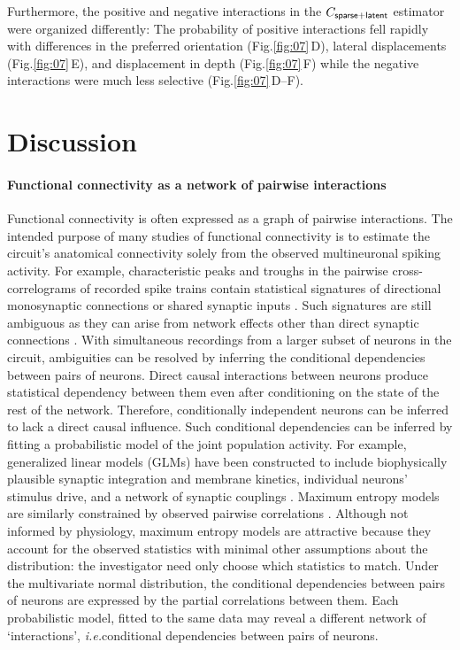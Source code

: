 \documentclass[10pt]{article}
\newcommand{\sq}[1]{\lq#1\rq}
\newcommand{\figref}[2]{Fig.\;\ref{fig:#1}\,#2}
\newcommand{\ie}{\emph{i.e.}\;}
\begin{document}
Furthermore, the positive and negative interactions in the $C_{\sf sparse+latent}$ estimator were organized differently: The probability of positive interactions fell rapidly with differences in the preferred orientation (\figref{07}{D}), lateral displacements (\figref{07}{E}), and displacement in depth (\figref{07}{F}) while the negative interactions were much less selective (\figref{07}{D--F}).

\section*{Discussion}
\paragraph{Functional connectivity as a network of pairwise interactions}
Functional connectivity is often expressed as a graph of pairwise interactions. The intended purpose of many studies of functional connectivity is to estimate the circuit's anatomical connectivity solely from the observed multineuronal spiking activity.  For example, characteristic peaks and troughs in the pairwise cross-correlograms of recorded spike trains contain statistical signatures of directional monosynaptic connections or shared synaptic inputs \cite{Gerstein:1964, Perkel:1967, Moore:1970, Alonso:1998, Denman:2013}.  Such signatures are still ambiguous as they can arise from network effects other than direct synaptic connections \cite{Aertsen:1989}.  With simultaneous recordings from a larger subset of neurons in the circuit, ambiguities can be resolved by inferring the conditional dependencies between pairs of neurons.  Direct causal interactions between neurons produce statistical dependency between them even after conditioning on the state of the rest of the network. Therefore, conditionally independent neurons can be inferred to lack a direct causal influence.  Such conditional dependencies can be inferred by fitting a probabilistic model of the joint population activity. For example, generalized linear models (GLMs) have been constructed to  include biophysically plausible synaptic integration and membrane kinetics, individual neurons' stimulus drive, and a network of synaptic couplings \cite{Pillow:2008}.  Maximum entropy models are similarly constrained by observed pairwise correlations \cite{Schneidman:2006, Tkacik:2006, Yu:2008, Tang:2008, Shlens:2009} .  Although not informed by physiology, maximum entropy models are attractive because they account for the observed statistics with minimal other assumptions about the distribution: the investigator need only choose which statistics to match.  Under the multivariate normal distribution, the conditional dependencies between pairs of neurons are expressed by the partial correlations between them.   Each probabilistic model, fitted to the same data may reveal a different network of \sq{interactions},  \ie conditional dependencies between pairs of neurons. 
\end{document}
